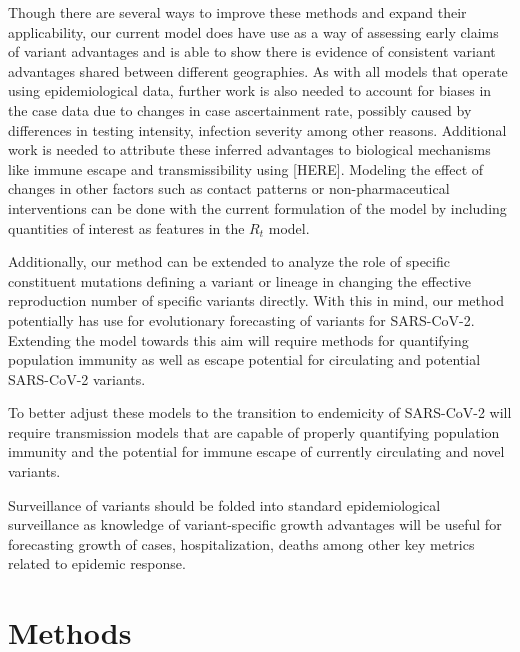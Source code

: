 \documentclass[11pt,oneside,letterpaper]{article}
\begin{document}
Though there are several ways to improve these methods and expand their applicability, our current model does have use as a way of assessing early claims of variant advantages and is able to show there is evidence of consistent variant advantages shared between different geographies.
As with all models that operate using epidemiological data, further work is also needed to account for biases in the case data due to changes in case ascertainment rate, possibly caused by differences in testing intensity, infection severity among other reasons.
Additional work is needed to attribute these inferred advantages to biological mechanisms like immune escape and transmissibility using [HERE].
Modeling the effect of changes in other factors such as contact patterns or non-pharmaceutical interventions can be done with the current formulation of the model by including quantities of interest as features in the $R_{t}$ model.

Additionally, our method can be extended to analyze the role of specific constituent mutations defining a variant or lineage in changing the effective reproduction number of specific variants directly.
With this in mind, our method potentially has use for evolutionary forecasting of variants for SARS-CoV-2.
Extending the model towards this aim will require methods for quantifying population immunity as well as escape potential for circulating and potential SARS-CoV-2 variants.

To better adjust these models to the transition to endemicity of SARS-CoV-2 will require transmission models that are capable of properly quantifying population immunity and the potential for immune escape of currently circulating and novel variants.

Surveillance of variants should be folded into standard epidemiological surveillance as knowledge of variant-specific growth advantages will be useful for forecasting growth of cases, hospitalization, deaths among other key metrics related to epidemic response.



\section*{Methods}
\end{document}
